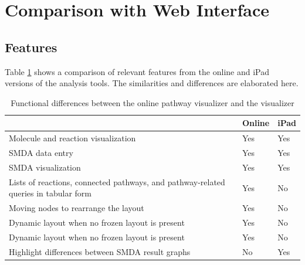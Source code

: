\section{Comparison with \pathcasemaw Web Interface}
\label{sect:maw_comparison}

\subsection{Features}
\label{sect:maw_comparison_features}

Table \ref{fig:maw_comparison_table} shows a comparison of relevant features
from the online and iPad versions of the \pathcasemaw analysis tools. The
similarities and differences are elaborated here.

\begin{table}[ht!]
\centering
\begin{tabular}{ | p{3in} | l | l | }
    \hline
                        & Online    & iPad \\ \hline

    Molecule and reaction visualization
                        & Yes       & Yes \\ \hline

    SMDA data entry     & Yes       & Yes \\ \hline

    SMDA visualization  & Yes       & Yes \\ \hline

    Lists of reactions, connected pathways, and pathway-related queries in
    tabular form
                        & Yes       & No \\ \hline

    Moving nodes to rearrange the layout
                        & Yes       & No \\ \hline

    Dynamic layout when no frozen layout is present
                        & Yes       & No \\ \hline

    Dynamic layout when no frozen layout is present
                        & Yes       & No \\ \hline

    Highlight differences between SMDA result graphs
                        & No        & Yes \\ \hline
\end{tabular}
    \caption{Functional differences between the online \pathcasemaw pathway
    visualizer and the \mawapp visualizer}
    \label{fig:maw_comparison_table}
\end{table}

